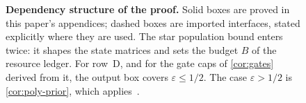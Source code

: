 \documentclass[11pt,letterpaper]{article}
\theoremstyle{definition}
\theoremstyle{remark}
\begin{document}
\begin{figure}[tp]
\caption{\textbf{Dependency structure of the proof.} Solid boxes are
proved in this paper's appendices; dashed boxes are imported
interfaces, stated explicitly where they are used. The star
population bound enters twice: it shapes the state matrices and sets
the budget $B$ of the resource ledger. For row~D, and for the gate caps
of \cref{cor:gates} derived from it, the output box covers
$\varepsilon\le1/2$. The case $\varepsilon>1/2$ is
\cref{cor:poly-prior}, which applies~\cite[Theorem~2.3]{NagCubic}.}
\label{fig:dag}
\end{figure}
\end{document}
